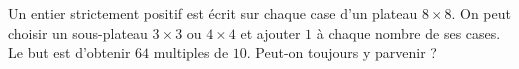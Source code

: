 Un entier strictement positif est écrit sur chaque case d'un plateau $8 \times 8$. On peut choisir un sous-plateau $3 \times 3$ ou $4 \times 4$ et ajouter $1$ à chaque nombre de ses cases. Le but est d'obtenir $64$ multiples de $10$. Peut-on toujours y parvenir ?
